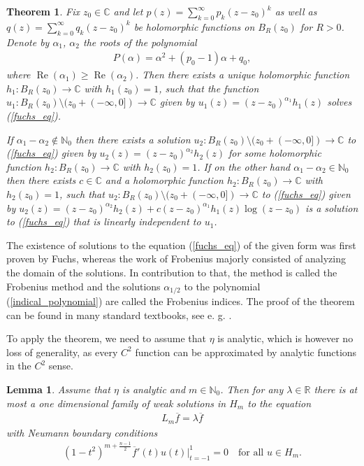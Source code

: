 \documentclass[12pt,twoside]{amsart}
\numberwithin{satz}{section}
\newtheorem{theorem}[satz]{Theorem}
\newtheorem{lemma}[satz]{Lemma}
\theoremstyle{definition}
\numberwithin{equation}{section}
\newcommand\R{\mathbb{R}}
\newcommand\C{\mathbb{C}}
\newcommand\N{\mathbb{N}}
\newcommand\Rea{\operatorname{Re}}
\begin{document}
	\begin{theorem}\label{frobenius_method}
		Fix $z_0\in\C$ and let $p(z)=\sum_{k=0}^\infty p_k(z-z_0)^k$ as well as $q(z)=\sum_{k=0}^\infty q_k(z-z_0)^k$ be holomorphic functions on $B_R(z_0)$ for $R>0$. Denote by $\alpha_1$, $\alpha_2$ the roots of the polynomial
		\begin{align}\label{indical_polynomial}
			P(\alpha)=\alpha^2+(p_0-1)\alpha+q_0,
		\end{align}
		where $\Rea(\alpha_1)\geq \Rea(\alpha_2)$. Then there exists a unique holomorphic function $h_1:B_R(z_0)\to\C$ with $h_1(z_0)=1$, such that the function $u_1:B_R(z_0)\setminus (z_0+(-\infty,0])\to\C$ given by $u_1(z)=(z-z_0)^{\alpha_1} h_1(z)$ solves (\ref{fuchs_eq}). 
		
		If $\alpha_1-\alpha_2\notin \N_0$ then there exists a solution $u_2:B_R(z_0)\setminus (z_0+(-\infty,0])\to\C$ to (\ref{fuchs_eq}) given by $u_2(z)=(z-z_0)^{\alpha_2} h_2(z)$ for some holomorphic function $h_2:B_R(z_0)\to\C$ with $h_2(z_0)=1$. If on the other hand $\alpha_1-\alpha_2\in\N_0$ then there exists $c\in\C$ and a holomorphic function $h_2:B_R(z_0)\to\C$ with $h_2(z_0)=1$, such that $u_2:B_R(z_0)\setminus (z_0+(-\infty,0])\to\C$ to (\ref{fuchs_eq}) given by $u_2(z)=(z-z_0)^{\alpha_2} h_2(z)+c(z-z_0)^{\alpha_1}h_1(z)\log(z-z_0)$ is a solution to (\ref{fuchs_eq}) that is linearly independent to $u_1$.
	\end{theorem}
	
	The existence of solutions to the equation (\ref{fuchs_eq}) of the given form was first proven by Fuchs, whereas the work of Frobenius majorly consisted of analyzing the domain of the solutions. In contribution to that, the method is called the Frobenius method and the solutions $\alpha_{1/2}$ to the polynomial (\ref{indical_polynomial}) are called the Frobenius indices. The proof of the theorem can be found in many standard textbooks, see e. g. \cite[Section V]{teschl}.
	
	To apply the theorem, we need to assume that $\eta$ is analytic, which is however no loss of generality, as every $C^2$ function can be approximated by analytic functions in the $C^2$ sense. 
	
	\begin{lemma}\label{lemma_sigle_ev}
		Assume that $\eta$ is analytic and $m\in\N_0$. Then for any $\lambda\in \R$ there is at most a one dimensional family of weak solutions in $H_m$ to the equation
		\begin{align}\label{sturm_liouville}
			L_m\overline{f}=\lambda\overline{f}
		\end{align}
		with Neumann boundary conditions
		\begin{align}\label{boundary_conditions_arbitrary_m}
			(1-t^2)^{m+\frac{n-1}{2}}\overline{f}'(t)u(t)\big|_{t=-1}^1=0 \quad \text{for all } u\in H_m.
		\end{align}
	\end{lemma}
	
\end{document}
